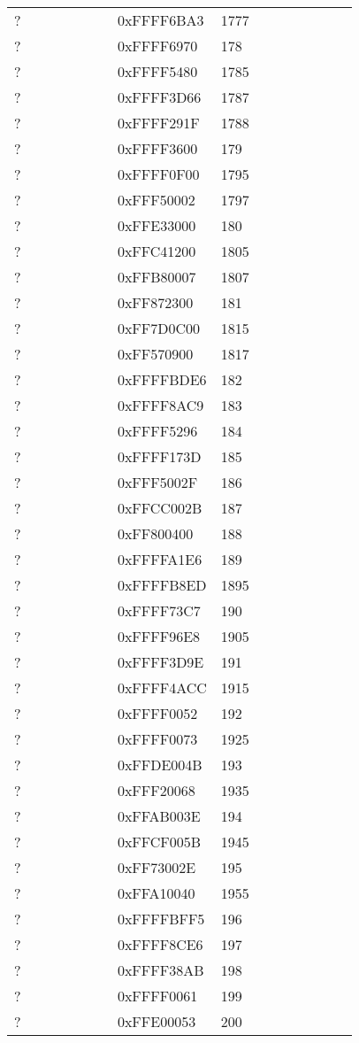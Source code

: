 \begin{longtable}{p{0.3\linewidth} p{0.3\linewidth} p{0.4\linewidth}}
? &  0xFFFF6BA3 &  1777\\
? &  0xFFFF6970 &  178\\
? &  0xFFFF5480 &  1785\\
? &  0xFFFF3D66 &  1787\\
? &  0xFFFF291F &  1788\\
? &  0xFFFF3600 &  179\\
? &  0xFFFF0F00 &  1795\\
? &  0xFFF50002 &  1797\\
? &  0xFFE33000 &  180\\
? &  0xFFC41200 &  1805\\
? &  0xFFB80007 &  1807\\
? &  0xFF872300 &  181\\
? &  0xFF7D0C00 &  1815\\
? &  0xFF570900 &  1817\\
? &  0xFFFFBDE6 &  182\\
? &  0xFFFF8AC9 &  183\\
? &  0xFFFF5296 &  184\\
? &  0xFFFF173D &  185\\
? &  0xFFF5002F &  186\\
? &  0xFFCC002B &  187\\
? &  0xFF800400 &  188\\
? &  0xFFFFA1E6 &  189\\
? &  0xFFFFB8ED &  1895\\
? &  0xFFFF73C7 &  190\\
? &  0xFFFF96E8 &  1905\\
? &  0xFFFF3D9E &  191\\
? &  0xFFFF4ACC &  1915\\
? &  0xFFFF0052 &  192\\
? &  0xFFFF0073 &  1925\\
? &  0xFFDE004B &  193\\
? &  0xFFF20068 &  1935\\
? &  0xFFAB003E &  194\\
? &  0xFFCF005B &  1945\\
? &  0xFF73002E &  195\\
? &  0xFFA10040 &  1955\\
? &  0xFFFFBFF5 &  196\\
? &  0xFFFF8CE6 &  197\\
? &  0xFFFF38AB &  198\\
? &  0xFFFF0061 &  199\\
? &  0xFFE00053 &  200\\

\end{longtable}
